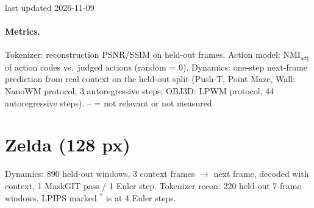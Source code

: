 \documentclass[10pt]{article}
\begin{document}
\small
{}\hfill last updated 2026-11-09

\paragraph{Metrics.}
Tokenizer: reconstruction PSNR/SSIM on held-out frames.
Action model: NMI$_\text{adj}$ of action codes vs.\ judged actions (random = 0).
Dynamics: one-step next-frame prediction from real context on the held-out split (Push-T, Point Maze, Wall: NanoWM protocol, 3 autoregressive steps; OBJ3D: LPWM protocol, 44 autoregressive steps).
-- = not relevant or not measured.

\section*{Zelda (128 px)}
Dynamics: 890 held-out windows, 3 context frames $\to$ next frame, decoded with context, 1 MaskGIT pass / 1 Euler step.
Tokenizer recon: 220 held-out 7-frame windows. LPIPS marked $^*$ is at 4 Euler steps.
\end{document}
